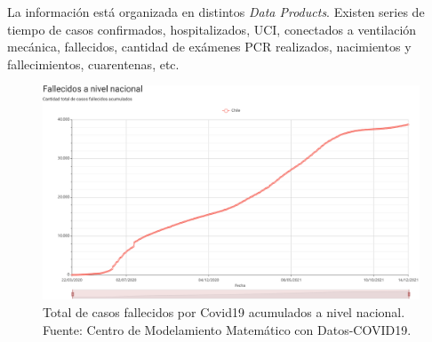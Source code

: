 La información está organizada en distintos \textit{Data Products}. Existen series de tiempo de casos confirmados, hospitalizados, UCI, conectados a ventilación mecánica, fallecidos, cantidad de exámenes PCR realizados, nacimientos y fallecimientos, cuarentenas, etc. 

\begin{figure}[h]
\centering
\includegraphics[width=\textwidth]{img/metodologia/datos/fallecidos_nacional.png}
\caption{Total de casos fallecidos por Covid19 acumulados a nivel nacional. Fuente: Centro de Modelamiento Matemático  con Datos-COVID19.}
\label{img:cmm-fallecidos}
\end{figure}

